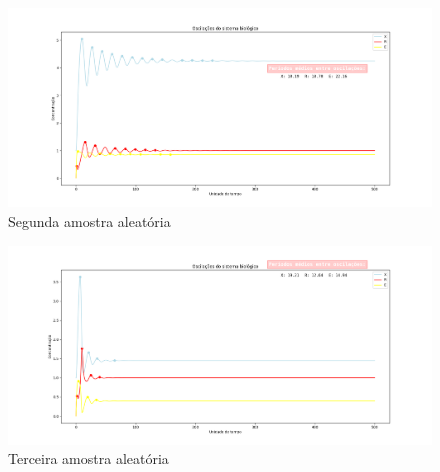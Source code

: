 \documentclass[brazilian,12pt,a4paper,final]{article}
\begin{document}
	\begin{figure}[hbtp]
		\begin{center}
			\includegraphics[width=16cm]{Sample2.png}
			\caption{Segunda amostra aleatória}
			\label{fig}
		\end{center}
	\end{figure}
	
	\begin{figure}[hbtp]
		\begin{center}
			\includegraphics[width=16cm]{Sample3.png}
			\caption{Terceira amostra aleatória}
			\label{fig}
		\end{center}
	\end{figure}
	
	
	
	
	
	
	
	
	
	
	
	
	
	
	
	
	
	
	
	
	
	
	
	

	
	
	
	
	
	
	
	
	
	
	
\end{document}
